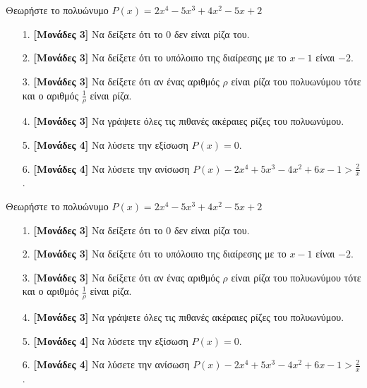 \documentclass[12pt]{article}
\begin{document}
\part*{}

Θεωρήστε το πολυώνυμο $P(x)=2x^4-5x^3+4x^2-5x+2$
\begin{enumerate}
 \item[1.] \textbf{[Μονάδες 3]} Να δείξετε ότι το 0 δεν είναι ρίζα του.
 \item[2.] \textbf{[Μονάδες 3]} Να δείξετε ότι το υπόλοιπο της διαίρεσης με το $x-1$ είναι $-2$.
 \item[3.] \textbf{[Μονάδες 3]} Να δείξετε ότι αν ένας αριθμός $ρ$ είναι ρίζα του πολυωνύμου τότε και ο αριθμός $\frac{1}{ρ}$ είναι ρίζα.
 \item[4.] \textbf{[Μονάδες 3]} Να γράψετε όλες τις πιθανές ακέραιες ρίζες του πολυωνύμου.
 \item[5.] \textbf{[Μονάδες 4]} Να λύσετε την εξίσωση $P(x)=0$.
 \item[6.] \textbf{[Μονάδες 4]} Να λύσετε την ανίσωση $P(x)-2x^4+5x^3-4x^2+6x-1>\frac{2}{x}$.
\end{enumerate}

\pagebreak


Θεωρήστε το πολυώνυμο $P(x)=2x^4-5x^3+4x^2-5x+2$
\begin{enumerate}
 \item[1.] \textbf{[Μονάδες 3]} Να δείξετε ότι το 0 δεν είναι ρίζα του.
 \item[2.] \textbf{[Μονάδες 3]} Να δείξετε ότι το υπόλοιπο της διαίρεσης με το $x-1$ είναι $-2$.
 \item[3.] \textbf{[Μονάδες 3]} Να δείξετε ότι αν ένας αριθμός $ρ$ είναι ρίζα του πολυωνύμου τότε και ο αριθμός $\frac{1}{ρ}$ είναι ρίζα.
 \item[4.] \textbf{[Μονάδες 3]} Να γράψετε όλες τις πιθανές ακέραιες ρίζες του πολυωνύμου.
 \item[5.] \textbf{[Μονάδες 4]} Να λύσετε την εξίσωση $P(x)=0$.
 \item[6.] \textbf{[Μονάδες 4]} Να λύσετε την ανίσωση $P(x)-2x^4+5x^3-4x^2+6x-1>\frac{2}{x}$.
\end{enumerate}

\part*{}
\end{document}
